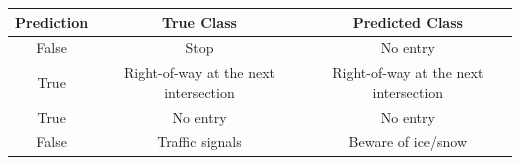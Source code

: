\documentclass[11pt]{article}
\begin{document}
\begin{longtable}[]{@{}ccc@{}}
\toprule
\begin{minipage}[b]{0.14\columnwidth}\centering
Prediction\strut
\end{minipage} & \begin{minipage}[b]{0.37\columnwidth}\centering
True Class\strut
\end{minipage} & \begin{minipage}[b]{0.40\columnwidth}\centering
Predicted Class\strut
\end{minipage}\tabularnewline
\midrule
\endhead
\begin{minipage}[t]{0.14\columnwidth}\centering
{False}\strut
\end{minipage} & \begin{minipage}[t]{0.37\columnwidth}\centering
Stop\strut
\end{minipage} & \begin{minipage}[t]{0.40\columnwidth}\centering
No entry\strut
\end{minipage}\tabularnewline
\begin{minipage}[t]{0.14\columnwidth}\centering
{True}\strut
\end{minipage} & \begin{minipage}[t]{0.37\columnwidth}\centering
Right-of-way at the next intersection\strut
\end{minipage} & \begin{minipage}[t]{0.40\columnwidth}\centering
Right-of-way at the next intersection\strut
\end{minipage}\tabularnewline
\begin{minipage}[t]{0.14\columnwidth}\centering
{True}\strut
\end{minipage} & \begin{minipage}[t]{0.37\columnwidth}\centering
No entry\strut
\end{minipage} & \begin{minipage}[t]{0.40\columnwidth}\centering
No entry\strut
\end{minipage}\tabularnewline
\begin{minipage}[t]{0.14\columnwidth}\centering
{False}\strut
\end{minipage} & \begin{minipage}[t]{0.37\columnwidth}\centering
Traffic signals\strut
\end{minipage} & \begin{minipage}[t]{0.40\columnwidth}\centering
Beware of ice/snow\strut
\end{minipage}\tabularnewline
\bottomrule
\end{longtable}
\end{document}
